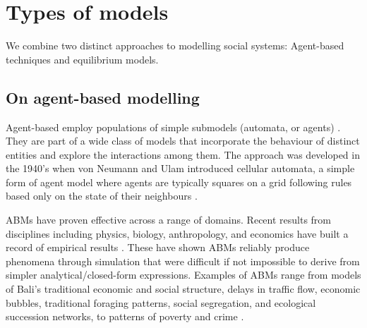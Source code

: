 


\section{Types of models}\label{sec-types}
We combine two distinct approaches to modelling social systems: Agent-based techniques and equilibrium models. 

\subsection{On agent-based modelling}
Agent-based employ populations of simple submodels (automata, or agents) \cite{shalizi_methods_2006}. They are part of a wide class of models that incorporate the behaviour of distinct entities and explore the interactions among them.  The approach was developed in the 1940's when von Neumann and Ulam introduced cellular automata, a simple form of agent model where agents are typically squares on a grid following rules based only on the state of their neighbours \cite{banksStatisticalChallengesAgentBased2021}.

ABMs have proven effective across a range of domains. Recent results from disciplines including physics, biology, anthropology, and economics have built a record of empirical results \cite{parkerMultiAgentSystemsSimulation2003, parker_multi-agent_2003, helbing_social_2011-1}. 
These have shown ABMs reliably produce phenomena through simulation that were difficult if not impossible to derive from simpler analytical/closed-form expressions. 
Examples of ABMs range from models of Bali's traditional economic and social structure, delays in traffic flow, economic bubbles, 
traditional foraging patterns, %
social segregation, and ecological succession networks, to patterns of poverty and crime \cite{open_agent_based_modeling_consortium_comses_????}. %


